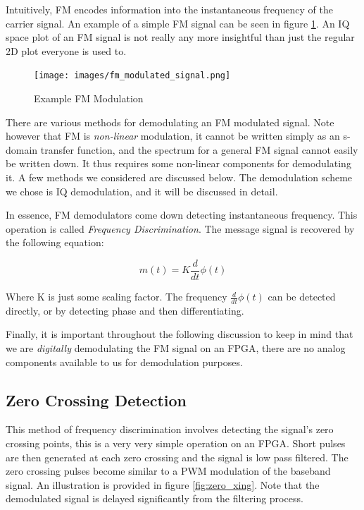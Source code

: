 \documentclass[a4paper, 12pt, notitlepage]{article}
\begin{document}
Intuitively, FM encodes information into the instantaneous frequency of the carrier signal.  An example of a simple FM signal can be seen in figure \ref{fig:fm_modulated_signal}.  An IQ space plot of an FM signal is not really any more insightful than just the regular 2D plot everyone is used to.

\begin{figure}
  \centering
  \caption{Example FM Modulation}
  \label{fig:fm_modulated_signal}
  \texttt{[image: images/fm\_modulated\_signal.png]}
\end{figure}

There are various methods for demodulating an FM modulated signal.  Note however that FM is \textit{non-linear} modulation, it cannot be written simply as an s-domain transfer function, and the spectrum for a general FM signal cannot easily be written down.  It thus requires some non-linear components for demodulating it.  A few methods we considered are discussed below.  The demodulation scheme we chose is IQ demodulation, and it will be discussed in detail.

In essence, FM demodulators come down detecting instantaneous frequency.  This operation is called \textit{Frequency Discrimination}.  The message signal is recovered by the following equation:

\begin{equation}
  m(t) = K\frac{d}{dt}\phi(t)
\end{equation}

Where K is just some scaling factor.  The frequency $\frac{d}{dt}\phi(t)$ can be detected directly, or by detecting phase and then differentiating.

Finally, it is important throughout the following discussion to keep in mind that we are \textit{digitally} demodulating the FM signal on an FPGA, there are no analog components available to us for demodulation purposes.

\subsection{Zero Crossing Detection}
This method of frequency discrimination involves detecting the signal's zero crossing points, this is a very very simple operation on an FPGA.  Short pulses are then generated at each zero crossing and the signal is low pass filtered.  The zero crossing pulses become similar to a PWM modulation of the baseband signal.  An illustration is provided in figure \ref{fig:zero_xing}.  Note that the demodulated signal is delayed significantly from the filtering process.
\end{document}
